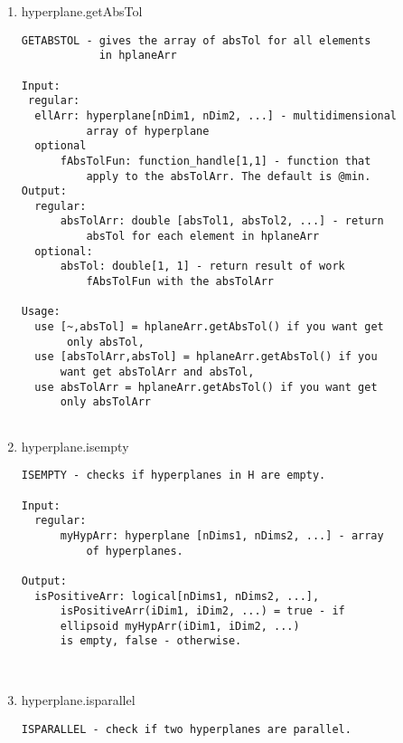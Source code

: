 \begin{enumerate}
\begin{lstlisting}
  [normVec, hypScal] = DOUBLE(myHyp) - returns normal
      vector and scalar value of the hyperplane.

Input:
  regular:
      myHyp: hyperplane [1, 1] - single hyperplane of
        dimention nDims.

Output:
  normVec: double[nDims, 1] - normal vector of the
     hyperplane myHyp.
  hypScal: double[1, 1] - scalar of the hyperplane myHyp.



\end{lstlisting}
\fontfamily{\familydefault}
\selectfont
\item {hyperplane.getAbsTol}
\selectfont
\begin{lstlisting}
GETABSTOL - gives the array of absTol for all elements
            in hplaneArr

Input:
 regular:
  ellArr: hyperplane[nDim1, nDim2, ...] - multidimensional
          array of hyperplane
  optional
      fAbsTolFun: function_handle[1,1] - function that
          apply to the absTolArr. The default is @min.
Output:
  regular:
      absTolArr: double [absTol1, absTol2, ...] - return
          absTol for each element in hplaneArr
  optional:
      absTol: double[1, 1] - return result of work
          fAbsTolFun with the absTolArr

Usage:
  use [~,absTol] = hplaneArr.getAbsTol() if you want get
       only absTol,
  use [absTolArr,absTol] = hplaneArr.getAbsTol() if you
      want get absTolArr and absTol,
  use absTolArr = hplaneArr.getAbsTol() if you want get
      only absTolArr


\end{lstlisting}
\fontfamily{\familydefault}
\selectfont
\item {hyperplane.isempty}
\selectfont
\begin{lstlisting}
ISEMPTY - checks if hyperplanes in H are empty.

Input:
  regular:
      myHypArr: hyperplane [nDims1, nDims2, ...] - array
          of hyperplanes.

Output:
  isPositiveArr: logical[nDims1, nDims2, ...],
      isPositiveArr(iDim1, iDim2, ...) = true - if
      ellipsoid myHypArr(iDim1, iDim2, ...)
      is empty, false - otherwise.



\end{lstlisting}
\fontfamily{\familydefault}
\selectfont
\item {hyperplane.isparallel}
\selectfont
\begin{lstlisting}
ISPARALLEL - check if two hyperplanes are parallel.


\end{lstlisting}
\end{enumerate}
